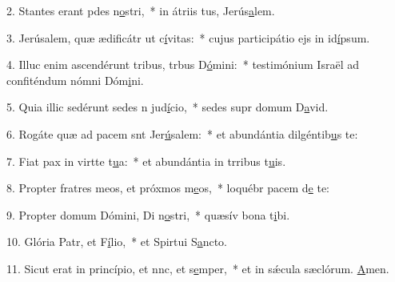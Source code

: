 2. Stantes erant pdes n\uline{o}stri,~* in átriis tus, Jerús\uline{a}lem.\par 
3. Jerúsalem, quæ ædificátr ut c\uline{í}vitas:~* cujus participátio ejs in id\uline{í}psum.\par 
4. Illuc enim ascendérunt tribus, trbus D\uline{ó}mini:~* testimónium Israël ad confiténdum nómni Dóm\uline{i}ni.\par 
5. Quia illic sedérunt sedes n jud\uline{í}cio,~* sedes supr domum D\uline{a}vid.\par 
6. Rogáte quæ ad pacem snt Jer\uline{ú}salem:~* et abundántia dilgéntib\uline{u}s te:\par 
7. Fiat pax in virtte t\uline{u}a:~* et abundántia in trribus t\uline{u}is.\par 
8. Propter fratres meos, et próxmos m\uline{e}os,~* loquébr pacem d\uline{e} te:\par 
9. Propter domum Dómini, Di n\uline{o}stri,~* quæsív bona t\uline{i}bi.\par 
10. Glória Patr, et F\uline{í}lio,~* et Spirtui S\uline{a}ncto.\par 
11. Sicut erat in princípio, et nnc, et s\uline{e}mper,~* et in sǽcula sæclórum. \uline{A}men.\par 
